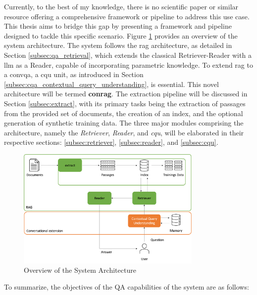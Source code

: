Currently, to the best of my knowledge, there is no scientific paper or similar resource offering a comprehensive framework or pipeline to address this use case. This thesis aims to bridge this gap by presenting a framework and pipeline designed to tackle this specific scenario. Figure \ref{fig:overview-system-architecture} provides an overview of the system architecture. The system follows the \gls{rag} architecture, as detailed in Section \ref{subsec:qa_retrieval}, which extends the classical Retriever-Reader with a \gls{llm} as a Reader, capable of incorporating parametric knowledge. To extend \gls{rag} to a \gls{convqa}, a \gls{cqu} unit, as introduced in Section \ref{subsec:cqa_contextual_query_understanding}, is essential. This novel architecture will be termed \textbf{\gls{conrag}}. The extraction pipeline will be discussed in Section \ref{subsec:extract}, with its primary tasks being the extraction of passages from the provided set of documents, the creation of an index, and the optional generation of synthetic training data. The three major modules comprising the architecture, namely the \textit{Retriever}, \textit{Reader}, and \textit{\gls{cqu}}, will be elaborated in their respective sections: \ref{subsec:retriever}, \ref{subsec:reader}, and \ref{subsec:cqu}.

\begin{figure}
    \centering
    \includegraphics[width=0.8\textwidth]{Grafiken/System_Architecture.png}
    \caption{Overview of the System Architecture}
    \label{fig:overview-system-architecture}
\end{figure}

To summarize, the objectives of the QA capabilities of the system are as follows:


